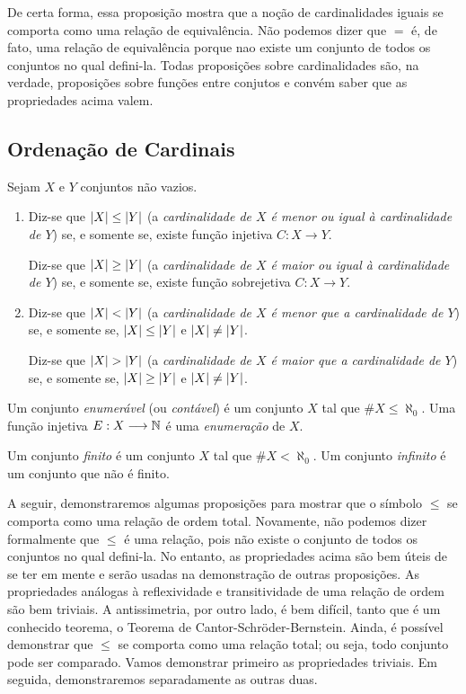 	De certa forma, essa proposição mostra que a noção de cardinalidades iguais se comporta como uma relação de equivalência. Não podemos dizer que $=$ é, de fato, uma relação de equivalência porque nao existe um conjunto de todos os conjuntos no qual defini-la. Todas proposições sobre cardinalidades são, na verdade, proposições sobre funções entre conjutos e convém saber que as propriedades acima valem.
	
\subsection{Ordenação de Cardinais}

\begin{defi}
	Sejam $X$ e $Y$ conjuntos não vazios.
	\begin{enumerate}
	\item Diz-se que $\left\vert{X}\right\vert \leq \left\vert{Y}\right\vert$ (a \emph{cardinalidade de $X$ é menor ou igual à cardinalidade de $Y$}) se, e somente se, existe função injetiva $C:X \to Y$.
	
	Diz-se que $\left\vert{X}\right\vert \geq \left\vert{Y}\right\vert$ (a \emph{cardinalidade de $X$ é maior ou igual à cardinalidade de $Y$}) se, e somente se, existe função sobrejetiva $C:X \to Y$.
	
	\item Diz-se que $\left\vert{X}\right\vert < \left\vert{Y}\right\vert$ (a \emph{cardinalidade de $X$ é menor que a cardinalidade de $Y$}) se, e somente se, $\left\vert{X}\right\vert \leq \left\vert{Y}\right\vert$ e $\left\vert{X}\right\vert \neq \left\vert{Y}\right\vert$.
	
	Diz-se que $\left\vert{X}\right\vert > \left\vert{Y}\right\vert$ (a \emph{cardinalidade de $X$ é maior que a cardinalidade de $Y$}) se, e somente se, $\left\vert{X}\right\vert \geq \left\vert{Y}\right\vert$ e $\left\vert{X}\right\vert \neq \left\vert{Y}\right\vert$.
	\end{enumerate}
\end{defi}

\begin{defi}
	Um conjunto \emph{enumerável} (ou \emph{contável}) é um conjunto $X$ tal que $\# X \leq \aleph_0$. Uma função injetiva $E: X \longrightarrow \mathbb{N}$ é uma \emph{enumeração} de $X$.
\end{defi}

\begin{defi}
	Um conjunto \emph{finito} é um conjunto $X$ tal que $\# X < \aleph_0$. Um conjunto \emph{infinito} é um conjunto que não é finito.
\end{defi}
	
	A seguir, demonstraremos algumas proposições para mostrar que o símbolo $\leq$ se comporta como uma relação de ordem total. Novamente, não podemos dizer formalmente que $\leq$ é uma relação, pois não existe o conjunto de todos os conjuntos no qual defini-la. No entanto, as propriedades acima são bem úteis de se ter em mente e serão usadas na demonstração de outras proposições. As propriedades análogas à reflexividade e transitividade de uma relação de ordem são bem triviais. A antissimetria, por outro lado, é bem difícil, tanto que é um conhecido teorema, o Teorema de Cantor-Schröder-Bernstein. Ainda, é possível demonstrar que $\leq$ se comporta como uma relação total; ou seja, todo conjunto pode ser comparado. Vamos demonstrar primeiro as propriedades triviais. Em seguida, demonstraremos separadamente as outras duas.

